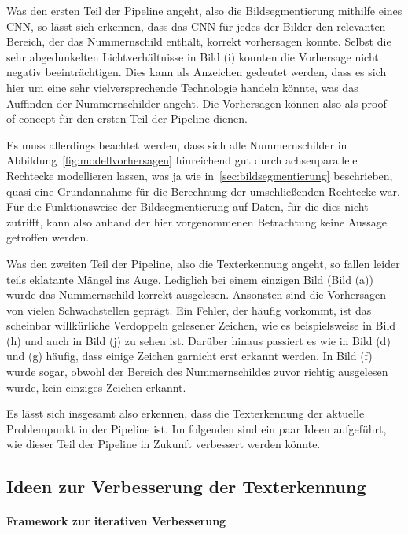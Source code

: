 Was den ersten Teil der Pipeline angeht, also die Bildsegmentierung
mithilfe eines CNN, so l\"asst sich erkennen, dass das CNN f\"ur jedes
der Bilder den relevanten Bereich, der das Nummernschild enth\"alt,
korrekt vorhersagen konnte.
Selbst die sehr abgedunkelten Lichtverh\"altnisse in Bild (i) konnten
die Vorhersage nicht negativ beeintr\"achtigen.
Dies kann als Anzeichen gedeutet werden, dass es sich hier um eine
sehr vielversprechende Technologie handeln k\"onnte, was das Auffinden
der Nummernschilder angeht.
Die Vorhersagen k\"onnen also als proof-of-concept f\"ur den ersten
Teil der Pipeline dienen.

Es muss allerdings beachtet werden, dass sich alle Nummernschilder in
Abbildung~\ref{fig:modellvorhersagen} hinreichend gut durch
achsenparallele Rechtecke modellieren lassen, was ja wie
in~\ref{sec:bildsegmentierung} beschrieben, quasi eine Grundannahme f\"ur
die Berechnung der umschlie{\ss}enden Rechtecke war.
F\"ur die Funktionsweise der Bildsegmentierung auf Daten, f\"ur die dies
nicht zutrifft, kann also anhand der hier vorgenommenen Betrachtung
keine Aussage getroffen werden.

Was den zweiten Teil der Pipeline, also die Texterkennung angeht, so
fallen leider teils eklatante M\"angel ins Auge.
Lediglich bei einem einzigen Bild (Bild (a)) wurde das Nummernschild
korrekt ausgelesen. Ansonsten sind die Vorhersagen von vielen
Schwachstellen gepr\"agt.
Ein Fehler, der h\"aufig vorkommt, ist das scheinbar
willk\"urliche Verdoppeln gelesener Zeichen, wie es beispielsweise
in Bild (h) und auch in Bild (j) zu sehen ist.
Dar\"uber hinaus passiert es wie in Bild (d) und (g) h\"aufig, dass
einige Zeichen garnicht erst erkannt werden.
In Bild (f) wurde sogar, obwohl der Bereich des Nummernschildes zuvor
richtig ausgelesen wurde, kein einziges Zeichen erkannt.

Es l\"asst sich insgesamt also erkennen, dass die Texterkennung
der aktuelle Problempunkt in der Pipeline ist.
Im folgenden sind ein paar Ideen aufgef\"uhrt, wie dieser Teil
der Pipeline in Zukunft verbessert werden k\"onnte.

\subsection{Ideen zur Verbesserung der Texterkennung}
\label{sec:verbesserungen}

\paragraph{Framework zur iterativen Verbesserung}

